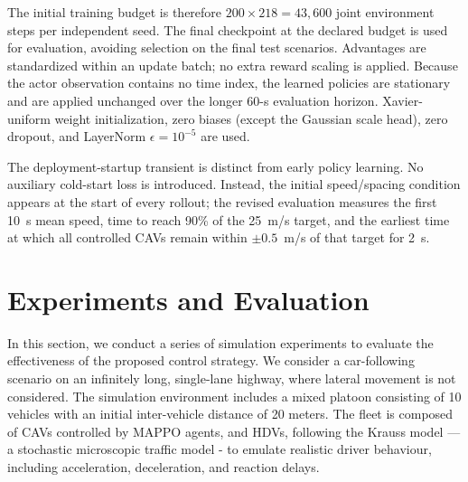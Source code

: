 \documentclass{ieeeaccess}
\begin{document}
The initial training budget is therefore $200\times218=43{,}600$ joint environment steps per independent seed. The final checkpoint at the declared budget is used for evaluation, avoiding selection on the final test scenarios. Advantages are standardized within an update batch; no extra reward scaling is applied. Because the actor observation contains no time index, the learned policies are stationary and are applied unchanged over the longer 60-s evaluation horizon. Xavier-uniform weight initialization, zero biases (except the Gaussian scale head), zero dropout, and LayerNorm $\epsilon=10^{-5}$ are used. %

The deployment-startup transient is distinct from early policy learning. No auxiliary cold-start loss is introduced. Instead, the initial speed/spacing condition appears at the start of every rollout; the revised evaluation measures the first 10~s mean speed, time to reach 90\% of the 25~m/s target, and the earliest time at which all controlled CAVs remain within $\pm0.5$~m/s of that target for 2~s. %

\section{Experiments and Evaluation}
\label{sec:exp_scenario}
In this section, we conduct a series of simulation experiments to evaluate the effectiveness of the proposed control strategy. We consider a car-following scenario on an infinitely long, single-lane highway, where lateral movement is not considered. The simulation environment includes a mixed platoon consisting of 10 vehicles with an initial inter-vehicle distance of 20 meters. The fleet is composed of CAVs controlled by MAPPO agents, and HDVs, following the Krauss model —a stochastic microscopic traffic model - to emulate realistic driver behaviour, including acceleration, deceleration, and reaction delays.
\end{document}

